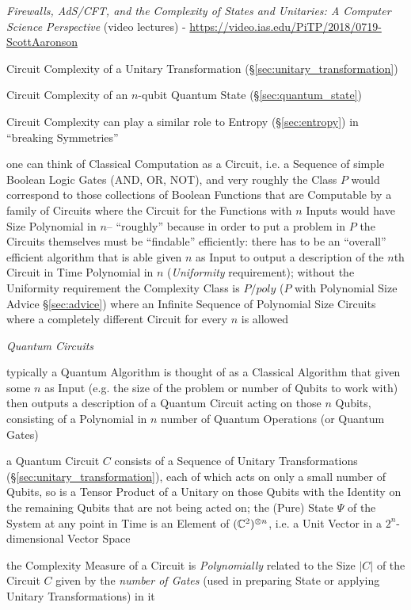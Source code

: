 \emph{Firewalls, AdS/CFT, and the Complexity of States and Unitaries: A Computer
  Science Perspective}
(video lectures)
-
\url{https://video.ias.edu/PiTP/2018/0719-ScottAaronson}

Circuit Complexity of a Unitary Transformation
(\S\ref{sec:unitary_transformation})

Circuit Complexity of an $n$-qubit Quantum State (\S\ref{sec:quantum_state})

Circuit Complexity can play a similar role to Entropy (\S\ref{sec:entropy}) in
``breaking Symmetries''

one can think of Classical Computation as a Circuit, i.e. a Sequence of simple
Boolean Logic Gates (AND, OR, NOT), and very roughly the Class $P$ would
correspond to those collections of Boolean Functions that are Computable by a
family of Circuits where the Circuit for the Functions with $n$ Inputs would
have Size Polynomial in $n$-- ``roughly'' because in order to put a problem in
$P$ the Circuits themselves must be ``findable'' efficiently: there has to be an
``overall'' efficient algorithm that is able given $n$ as Input to output a
description of the $n$th Circuit in Time Polynomial in $n$ (\emph{Uniformity}
requirement); without the Uniformity requirement the Complexity Class is
$P/poly$ ($P$ with Polynomial Size Advice \S\ref{sec:advice}) where an Infinite
Sequence of Polynomial Size Circuits where a completely different Circuit for
every $n$ is allowed

\emph{Quantum Circuits}

typically a Quantum Algorithm is thought of as a Classical Algorithm that given
some $n$ as Input (e.g. the size of the problem or number of Qubits to work
with) then outputs a description of a Quantum Circuit acting on those $n$
Qubits, consisting of a Polynomial in $n$ number of Quantum Operations (or
Quantum Gates)

a Quantum Circuit $C$ consists of a Sequence of Unitary Transformations
(\S\ref{sec:unitary_transformation}), each of which acts on only a small number
of Qubits, so is a Tensor Product of a Unitary on those Qubits with the Identity
on the remaining Qubits that are not being acted on; the (Pure) State $\Psi$ of
the System at any point in Time is an Element of $(\mathbb{C}^2)^{\otimes n}$, i.e.
a Unit Vector in a $2^n$-dimensional Vector Space

the Complexity Measure of a Circuit is \emph{Polynomially} related to the Size
$|C|$ of the Circuit $C$ given by the \emph{number of Gates} (used in preparing
State or applying Unitary Transformations) in it

